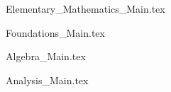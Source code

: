 \documentclass[crop=false,class=book,oneside]{standalone}                      %
\begin{document}
    \maketitle
    \tableofcontents
    \listoffigures
    \listoftables
    \clearpage
    \newif\ifmain
        
               {Elementary_Mathematics_Main.tex}


        {Foundations_Main.tex}

        {Algebra_Main.tex}
    
        {Analysis_Main.tex}
%
%
%
%
%        
%

    
\end{document}
